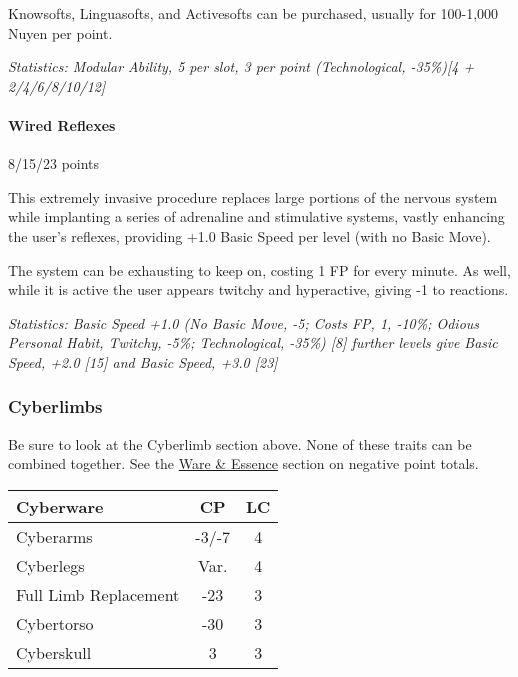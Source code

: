 \begin{multicols*}{3}
	Knowsofts, Linguasofts, and Activesofts can be purchased, usually for 100-1,000 Nuyen per point.
	
	\textit{\textcolor{OliveGreen}{Statistics: Modular Ability, 5 per slot, 3 per point (Technological, -35\%)[4 + 2/4/6/8/10/12]}}
	
	\paragraph{Wired Reflexes}
	\begin{flushright}
		8/15/23 points
	\end{flushright}
	
	This extremely invasive procedure replaces large portions of the nervous system while implanting a series of adrenaline and stimulative systems, vastly enhancing the user's reflexes, providing +1.0 Basic Speed per level (with no Basic Move).
	
	The system can be exhausting to keep on, costing 1 FP for every minute. As well, while it is active the user appears twitchy and hyperactive, giving -1 to reactions.
	
	\textit{\textcolor{OliveGreen}{Statistics: Basic Speed +1.0 (No Basic Move, -5; Costs FP, 1, -10\%; Odious Personal Habit, Twitchy, -5\%; Technological, -35\%) [8] further levels give Basic Speed, +2.0 [15] and Basic Speed, +3.0 [23]}}
	
	\subsubsection{Cyberlimbs}
	
	Be sure to look at the Cyberlimb section above. None of these traits can be combined together. See the \hyperref[ware]{Ware \& Essence} section on negative point totals.
	
	\begin{center}
		\begin{tabularx}{0.32\textwidth}{|X|c|c|}
			\hline
			Cyberware & CP & LC\\
			\hline
			\hline
			Cyberarms & -3/-7 & 4 \\
			Cyberlegs & Var. & 4 \\
			Full Limb Replacement & -23 & 3 \\
			Cybertorso & -30 & 3 \\
			Cyberskull & 3 & 3 \\
			\hline
		\end{tabularx}
	\end{center}
	

\end{multicols*}
